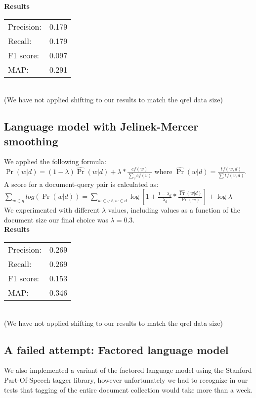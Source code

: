 \documentclass[12pt]{article}
\begin{document}
\textbf{Results}\\

\begin{center}
\begin{tabular}{l r}

	Precision: & 0.179\\
	Recall: & 0.179\\
	F1 score: & 0.097\\
	MAP: & 0.291\\
\end{tabular} \\
\footnotesize{(We have not applied shifting to our results to match the qrel data size)}
\end{center}

\subsection{Language model with Jelinek-Mercer smoothing}

We applied the following formula:
$\Pr(w|d)=(1-\lambda)\hat{\Pr}(w|d) + \lambda*\frac{cf(w)}{\sum_v cf(v)}$
where $\hat{\Pr}(w|d) = \frac{tf(w,d)}{\sum{tf(v,d)}}$. \\

A score for a document-query pair is calculated as:\\
$\sum_{w\in q} log(\Pr(w|d)) = \sum_{w \in q \land w\in d}\log[1 + \frac{1-\lambda_d}{\lambda_d}*\frac{\hat{\Pr}(w|d)}{\Pr(w)}] + \log \lambda$\\

We experimented with different $\lambda$ values, including values as a function of the document size our final choice was $\lambda=0.3$.\\

\textbf{Results}\\

\begin{center}
	\begin{tabular}{l r}
		Precision: & 0.269\\
		Recall: & 0.269\\
		F1 score: & 0.153\\
		MAP: & 0.346\\
\end{tabular} \\
\footnotesize{(We have not applied shifting to our results to match the qrel data size)}
\end{center}

\subsection{A failed attempt: Factored language model}
We also implemented a variant of the factored language model using the Stanford Part-Of-Speech tagger library, however unfortunately we had to recognize in our tests that tagging of the entire document collection would take more than a week.
\end{document}
